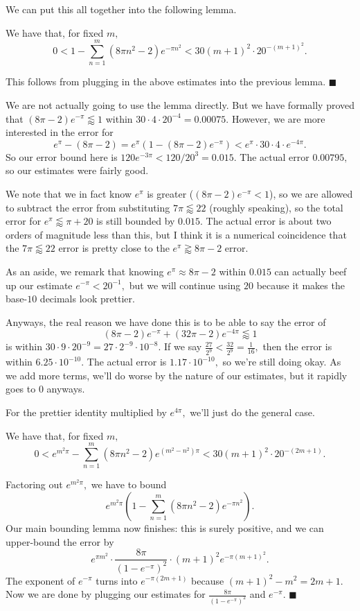 We can put this all together into the following lemma.
\begin{lemma}
    We have that, for fixed $m,$
    \[0<1-\sum_{n=1}^m\left(8\pi n^2-2\right)e^{-\pi n^2}<30(m+1)^2\cdot20^{-(m+1)^2}.\]
\end{lemma}
This follows from plugging in the above estimates into the previous lemma. $\blacksquare$

We are not actually going to use the lemma directly. But we have formally proved that $(8\pi-2)e^{-\pi}\lessapprox1$ within $30\cdot4\cdot20^{-4}=0.00075.$ However, we are more interested in the error for
\[e^\pi-(8\pi-2)=e^\pi\left(1-(8\pi-2)e^{-\pi}\right)<e^\pi\cdot30\cdot4\cdot e^{-4\pi}.\]
So our error bound here is $120e^{-3\pi}<120/20^3=0.015.$ The actual error $0.00795,$ so our estimates were fairly good.

We note that we in fact know $e^\pi$ is greater ($(8\pi-2)e^{-\pi}<1$), so we are allowed to subtract the error from substituting $7\pi\lessapprox22$ (roughly speaking), so the total error for $e^\pi\lessapprox\pi+20$ is still bounded by $0.015.$ The actual error is about two orders of magnitude less than this, but I think it is a numerical coincidence that the $7\pi\lessapprox22$ error is pretty close to the $e^\pi\gtrapprox8\pi-2$ error.

As an aside, we remark that knowing $e^\pi\approx8\pi-2$ within $0.015$ can actually beef up our estimate $e^{-\pi}<20^{-1},$ but we will continue using $20$ because it makes the base-$10$ decimals look prettier.

Anyways, the real reason we have done this is to be able to say the error of
\[(8\pi-2)e^{-\pi}+(32\pi-2)e^{-4\pi}\lessapprox1\]
is within $30\cdot9\cdot20^{-9}=27\cdot2^{-9}\cdot10^{-8}.$ If we say $\frac{27}{2^9}<\frac{32}{2^9}=\frac1{16},$ then the error is within $6.25\cdot10^{-10}.$ The actual error is $1.17\cdot10^{-10},$ so we're still doing okay. As we add more terms, we'll do worse by the nature of our estimates, but it rapidly goes to $0$ anyways.

For the prettier identity multiplied by $e^{4\pi},$ we'll just do the general case.
\begin{proposition}
    We have that, for fixed $m,$
    \[0<e^{m^2\pi}-\sum_{n=1}^m\left(8\pi n^2-2\right)e^{\left(m^2-n^2\right)\pi}<30(m+1)^2\cdot20^{-(2m+1)}.\]
\end{proposition}
Factoring out $e^{m^2\pi},$ we have to bound
\[e^{m^2\pi}\left(1-\sum_{n=1}^m\left(8\pi n^2-2\right)e^{-\pi n^2}\right).\]
Our main bounding lemma now finishes: this is surely positive, and we can upper-bound the error by
\[e^{\pi m^2}\cdot\frac{8\pi}{\left(1-e^{-\pi}\right)^2}\cdot(m+1)^2e^{-\pi(m+1)^2}.\]
The exponent of $e^{-\pi}$ turns into $e^{-\pi(2m+1)}$ because $(m+1)^2-m^2=2m+1.$ Now we are done by plugging our estimates for $\frac{8\pi}{\left(1-e^{-\pi}\right)^2}$ and $e^{-\pi}.$ $\blacksquare$

